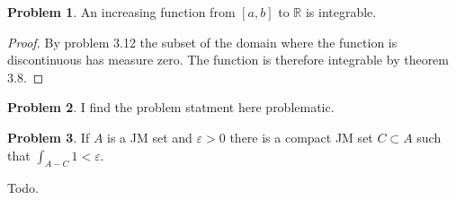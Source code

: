 \documentclass[20pt]{article}
\theoremstyle{plain}
\theoremstyle{definition}
\newtheorem*{problem}{Problem}
\newcommand{\reals}{\mathbb{R}}
\begin{document}
\begin{problem}{3.20}
  An increasing function from $[a, b]$ to $\reals$ is integrable.
\end{problem}
\begin{proof}
  By problem 3.12 the subset of the domain where the function is
  discontinuous has measure zero. The function is therefore integrable by theorem 3.8.
\end{proof}


\begin{problem}{3.21}
	\color{Blue}
	I find the problem statment here problematic.
\end{problem}

\begin{problem}{3.22}
  If $A$ is a JM set and $\varepsilon > 0$ there is a compact JM set $C \subset A$
  such that $\int_{A-C}1 < \varepsilon.$
\end{problem}
\color{Blue}
Todo.
\color{Black}
\end{document}
